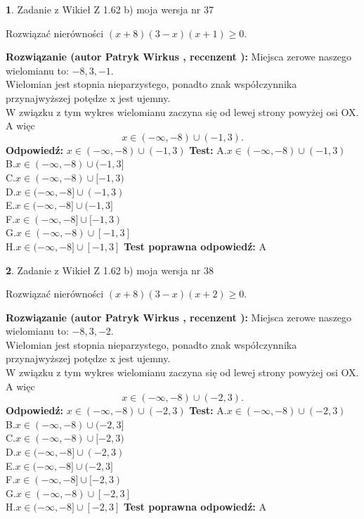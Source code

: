 \documentclass[12pt, a4paper]{article}
\theoremstyle{definition} %
\newtheorem{zad}{}
\newcommand{\zadStart}[1]{\begin{zad}#1\newline}
\newcommand{\zadStop}{\end{zad}}
\newcommand{\rozwStart}[2]{\noindent \textbf{Rozwiązanie (autor #1 , recenzent #2): }\newline}
\newcommand{\rozwStop}{\newline}
\newcommand{\odpStart}{\noindent \textbf{Odpowiedź:}\newline}
\newcommand{\odpStop}{\newline}
\newcommand{\testStart}{\noindent \textbf{Test:}\newline}
\newcommand{\testStop}{\newline}
\newcommand{\kluczStart}{\noindent \textbf{Test poprawna odpowiedź:}\newline}
\newcommand{\kluczStop}{\newline}
\begin{document}
\zadStart{Zadanie z Wikieł Z 1.62 b) moja wersja nr 37}

Rozwiązać nierówności $(x+8)(3-x)(x+1)\ge0$.
\zadStop
\rozwStart{Patryk Wirkus}{}
Miejsca zerowe naszego wielomianu to: $-8, 3, -1$.\\
Wielomian jest stopnia nieparzystego, ponadto znak współczynnika przy\linebreak najwyższej potędze x jest ujemny.\\ W związku z tym wykres wielomianu zaczyna się od lewej strony powyżej osi OX. A więc $$x \in (-\infty,-8) \cup (-1,3).$$
\rozwStop
\odpStart
$x \in (-\infty,-8) \cup (-1,3)$
\odpStop
\testStart
A.$x \in (-\infty,-8) \cup (-1,3)$\\
B.$x \in (-\infty,-8) \cup (-1,3]$\\
C.$x \in (-\infty,-8) \cup [-1,3)$\\
D.$x \in (-\infty,-8] \cup (-1,3)$\\
E.$x \in (-\infty,-8] \cup (-1,3]$\\
F.$x \in (-\infty,-8] \cup [-1,3)$\\
G.$x \in (-\infty,-8) \cup [-1,3]$\\
H.$x \in (-\infty,-8] \cup [-1,3]$
\testStop
\kluczStart
A
\kluczStop



\zadStart{Zadanie z Wikieł Z 1.62 b) moja wersja nr 38}

Rozwiązać nierówności $(x+8)(3-x)(x+2)\ge0$.
\zadStop
\rozwStart{Patryk Wirkus}{}
Miejsca zerowe naszego wielomianu to: $-8, 3, -2$.\\
Wielomian jest stopnia nieparzystego, ponadto znak współczynnika przy\linebreak najwyższej potędze x jest ujemny.\\ W związku z tym wykres wielomianu zaczyna się od lewej strony powyżej osi OX. A więc $$x \in (-\infty,-8) \cup (-2,3).$$
\rozwStop
\odpStart
$x \in (-\infty,-8) \cup (-2,3)$
\odpStop
\testStart
A.$x \in (-\infty,-8) \cup (-2,3)$\\
B.$x \in (-\infty,-8) \cup (-2,3]$\\
C.$x \in (-\infty,-8) \cup [-2,3)$\\
D.$x \in (-\infty,-8] \cup (-2,3)$\\
E.$x \in (-\infty,-8] \cup (-2,3]$\\
F.$x \in (-\infty,-8] \cup [-2,3)$\\
G.$x \in (-\infty,-8) \cup [-2,3]$\\
H.$x \in (-\infty,-8] \cup [-2,3]$
\testStop
\kluczStart
A
\kluczStop
\end{document}
